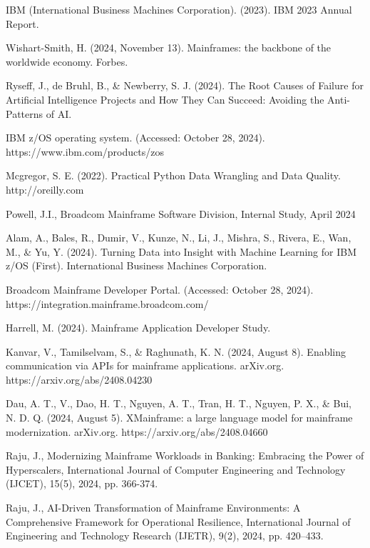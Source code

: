 \documentclass[a4paper]{article}
\begin{document}
\begin{thebibliography}{11}
    \bibitem[1]{}
    IBM (International Business Machines Corporation). (2023). IBM 2023 Annual Report.
    
    \bibitem[2]{}
    Wishart-Smith, H. (2024, November 13). Mainframes: the backbone of the worldwide economy. Forbes.
    
    \bibitem[3]{}
    Ryseff, J., de Bruhl, B., \& Newberry, S. J. (2024). The Root Causes of Failure for Artificial Intelligence Projects and How They Can Succeed: Avoiding the Anti-Patterns of AI.
    
    \bibitem[4]{}
    IBM z/OS operating system. (Accessed: October 28, 2024). https://www.ibm.com/products/zos 
    
    \bibitem[5]{}
    Mcgregor, S. E. (2022). Practical Python Data Wrangling and Data Quality. http://oreilly.com
    
    \bibitem[6]{}
    Powell, J.I., Broadcom Mainframe Software Division, Internal Study, April 2024
    
    \bibitem[7]{}
    Alam, A., Bales, R., Dumir, V., Kunze, N., Li, J., Mishra, S., Rivera, E., Wan, M., \& Yu, Y. (2024). Turning Data into Insight with Machine Learning for IBM z/OS (First). International Business Machines Corporation.
    
    \bibitem[8]{}
    Broadcom Mainframe Developer Portal. (Accessed: October 28, 2024). https://integration.mainframe.broadcom.com/
    
    \bibitem[9]{}
    Harrell, M. (2024). Mainframe Application Developer Study.
    
    \bibitem[10]{}
    Kanvar, V., Tamilselvam, S., \& Raghunath, K. N. (2024, August 8). Enabling communication via APIs for mainframe applications. arXiv.org. https://arxiv.org/abs/2408.04230
    
    \bibitem[11]{}
    Dau, A. T., V., Dao, H. T., Nguyen, A. T., Tran, H. T., Nguyen, P. X., \& Bui, N. D. Q. (2024, August 5). XMainframe: a large language model for mainframe modernization. arXiv.org. https://arxiv.org/abs/2408.04660
    
    \bibitem[12]{}
    Raju, J., Modernizing Mainframe Workloads in Banking: Embracing the Power of Hyperscalers, International Journal of Computer Engineering and Technology (IJCET), 15(5), 2024, pp. 366-374.
    
    \bibitem[13]{}
    Raju, J., AI-Driven Transformation of Mainframe Environments: A Comprehensive Framework for Operational Resilience, International Journal of Engineering and Technology Research (IJETR), 9(2), 2024, pp. 420–433.


\end{thebibliography}
\end{document}
